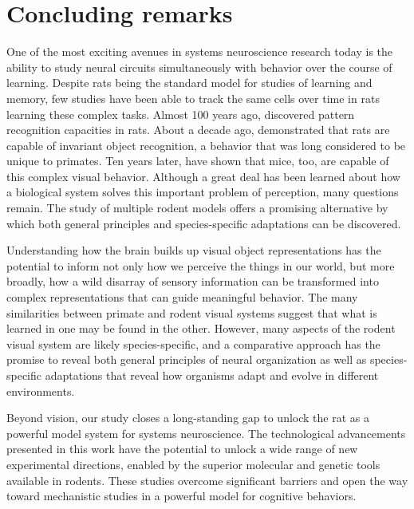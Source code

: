 \section{Concluding remarks}
One of the most exciting avenues in systems neuroscience research today is the ability to study neural circuits simultaneously with behavior over the course of learning. Despite rats being the standard model for studies of learning and memory, few studies have been able to track the same cells over time in rats learning these complex tasks. Almost 100 years ago, \citet{Lashley1938} discovered pattern recognition capacities in rats. About a decade ago, \citet{Zoccolan2009} demonstrated that rats are capable of invariant object recognition, a behavior that was long considered to be unique to primates. Ten years later, \citet{Froudarakis2020} have shown that mice, too, are capable of this complex visual behavior. Although a great deal has been learned about how a biological system solves this important problem of perception, many questions remain. The study of multiple rodent models offers a promising alternative by which both general principles and species-specific adaptations can be discovered. 

Understanding how the brain builds up visual object representations has the potential to inform not only how we perceive the things in our world, but more broadly, how a wild disarray of sensory information can be transformed into complex representations that can guide meaningful behavior. The many similarities between primate and rodent visual systems suggest that what is learned in one may be found in the other. However, many aspects of the rodent visual system are likely species-specific, and a comparative approach has the promise to reveal both general principles of neural organization as well as species-specific adaptations that reveal how organisms adapt and evolve in different environments. 

Beyond vision, our study closes a long-standing gap to unlock the rat as a powerful model system for systems neuroscience. The technological advancements presented in this work have the potential to unlock a wide range of new experimental directions, enabled by the superior molecular and genetic tools available in rodents. These studies overcome significant barriers and open the way toward mechanistic studies in a powerful model for cognitive behaviors.
